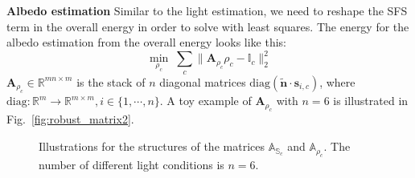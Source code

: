 \textbf{Albedo estimation}
Similar to the light estimation, we need to reshape the SFS term in the overall energy in order to solve with least squares.
The energy for the albedo estimation from the overall energy looks like this:
\begin{equation}\label{eq:robust_albedo_estimate}
	\min_{\rho_c} \; \sum_{c}\lVert \mathbf{A}_{\rho_c}\rho_c - \mathbb{I}_c \rVert^2_2 
\end{equation}
$ \mathbf{A}_{\rho_c} \in \mathbb{R}^{mn \times m}$ is the stack of $n$ diagonal matrices $\text{diag}(\tilde{\mathbf{n}} \cdot \mathbf{s}_{i,c})$, where $\text{diag} : \mathbb{R}^m \rightarrow \mathbb{R}^{m\times m}, i \in \{1, \cdots, n\}$.
A toy example of $\mathbf{A}_{\rho_c}$ with $n=6$ is illustrated in Fig.~\ref{fig:robust_matrix2}.

\begin{figure}[!ht]
\centering
{}
\quad
{}

\caption{Illustrations for the structures of the matrices $\mathbb{A}_{\mathbb{S}_c}$ and $\mathbb{A}_{\rho_c}$. The number of different light conditions is $n = 6$.}
\label{fig:robust_matrix}
\end{figure}

